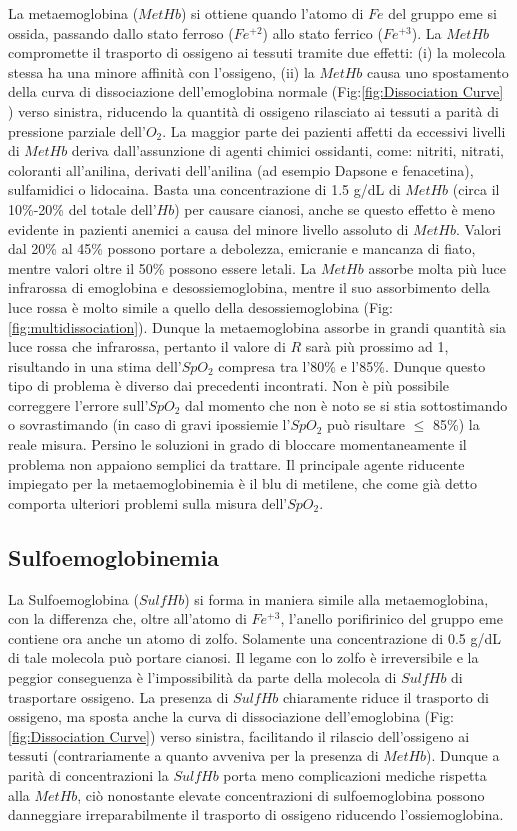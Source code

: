 \documentclass[12pt,a4paper, twoside, openright]{report}
\begin{document}
La metaemoglobina ($MetHb$) si ottiene quando l'atomo di $Fe$ del gruppo eme si ossida, passando dallo stato ferroso ($Fe^{+2}$) allo stato ferrico ($Fe^{+3}$). 
La $MetHb$ compromette il trasporto di ossigeno ai tessuti tramite due effetti: (i) la molecola stessa ha una minore affinità con l'ossigeno, (ii) la $MetHb$ causa uno spostamento della curva di dissociazione dell'emoglobina normale (Fig:\ref{fig:Dissociation Curve} ) verso sinistra, riducendo la quantità di ossigeno rilasciato ai tessuti a parità di pressione parziale dell'$O_2$. 
La maggior parte dei pazienti affetti da eccessivi livelli di $MetHb$ deriva dall'assunzione di agenti chimici ossidanti, come: nitriti, nitrati, coloranti all'anilina, derivati dell'anilina (ad esempio Dapsone e fenacetina), sulfamidici o lidocaina. 
Basta una concentrazione di 1.5 g/dL di $MetHb$ (circa il 10\%-20\% del totale dell'$Hb$) per causare cianosi, anche se questo effetto è meno evidente in pazienti anemici a causa del minore livello assoluto di $MetHb$. 
Valori dal 20\% al 45\% possono portare a debolezza, emicranie e mancanza di fiato, mentre valori oltre il 50\% possono essere letali. 
La $MetHb$ assorbe molta più luce infrarossa di emoglobina e desossiemoglobina, mentre il suo assorbimento della luce rossa è molto simile a quello della desossiemoglobina (Fig:\ref{fig:multidissociation}). 
Dunque la metaemoglobina assorbe in grandi quantità sia luce rossa che infrarossa, pertanto il valore di $R$ sarà più prossimo ad 1, risultando in una stima dell'$SpO_2$ compresa tra l'80\% e l'85\%. 
Dunque questo tipo di problema è diverso dai precedenti incontrati. 
Non è più possibile correggere l'errore sull'$SpO_2$  dal momento che non è noto se si stia sottostimando o sovrastimando (in caso di gravi ipossiemie l'$SpO_2$ può risultare $\leq$ 85\%) la reale misura. 
Persino le soluzioni in grado di bloccare momentaneamente il problema non appaiono semplici da trattare. 
Il principale agente riducente impiegato per la metaemoglobinemia è il blu di metilene, che come già detto comporta ulteriori problemi sulla misura dell'$SpO_2$.


\subsection{Sulfoemoglobinemia}

La Sulfoemoglobina ($SulfHb$) si forma in maniera simile alla metaemoglobina, con la differenza che, oltre all'atomo di $Fe^{+3}$, l'anello porifirinico del gruppo eme contiene ora anche un atomo di zolfo. 
Solamente una concentrazione di 0.5 g/dL di tale molecola può portare cianosi. 
Il legame con lo zolfo è irreversibile e la peggior conseguenza è l'impossibilità da parte della molecola di $SulfHb$ di trasportare ossigeno. 
La presenza di $SulfHb$ chiaramente riduce il trasporto di ossigeno, ma sposta anche la curva di dissociazione dell'emoglobina (Fig:\ref{fig:Dissociation Curve}) verso sinistra, facilitando il rilascio dell'ossigeno ai tessuti (contrariamente a quanto avveniva per la presenza di $MetHb$). 
Dunque a parità di concentrazioni la $SulfHb$ porta meno complicazioni mediche rispetta alla $MetHb$, ciò nonostante elevate concentrazioni di sulfoemoglobina possono danneggiare irreparabilmente il trasporto di ossigeno riducendo l'ossiemoglobina.
\end{document}
